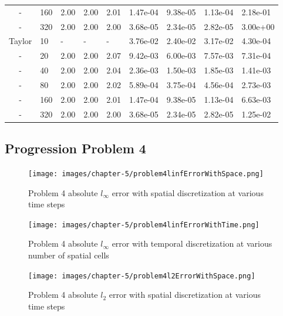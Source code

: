 \begin{table}[p]
{\begin{tabular}{cllllllll}
   - & 160 & 2.00 & 2.00 & 2.01 & 1.47e-04 & 9.38e-05 & 1.13e-04 & 2.18e-01 \\ 
   - & 320 & 2.00 & 2.00 & 2.00 & 3.68e-05 & 2.34e-05 & 2.82e-05 & 3.00e+00 \\ 
   \hline
   Taylor  &  10 & - & - & - & 3.76e-02 & 2.40e-02 & 3.17e-02 & 4.30e-04 \\ 
   -  &  20 & 2.00 & 2.00 & 2.07 & 9.42e-03 & 6.00e-03 & 7.57e-03 & 7.31e-04 \\ 
   -  &  40 & 2.00 & 2.00 & 2.04 & 2.36e-03 & 1.50e-03 & 1.85e-03 & 1.41e-03 \\ 
   -  &  80 & 2.00 & 2.00 & 2.02 & 5.89e-04 & 3.75e-04 & 4.56e-04 & 2.73e-03 \\ 
   -  & 160 & 2.00 & 2.00 & 2.01 & 1.47e-04 & 9.38e-05 & 1.13e-04 & 6.63e-03 \\ 
   -  & 320 & 2.00 & 2.00 & 2.00 & 3.68e-05 & 2.34e-05 & 2.82e-05 & 1.25e-02 \\ 
   \hline
   \end{tabular}
   }
\end{table}

\subsection{Progression Problem 4}
\begin{figure}[p]
    \centering
    \texttt{[image: images/chapter-5/problem4linfErrorWithSpace.png]}
    \caption{Problem 4 absolute $l_{\infty}$ error with spatial discretization at various time steps }
    \label{fig:problem4_linferror_spatial_results}
\end{figure}

\clearpage

\begin{figure}[p]
    \centering
    \texttt{[image: images/chapter-5/problem4linfErrorWithTime.png]}
    \caption{Problem 4 absolute $l_{\infty}$ error with temporal discretization at various number of spatial cells}
    \label{fig:problem4_linferror_time_results}
\end{figure}


\begin{figure}[p]
    \centering
    \texttt{[image: images/chapter-5/problem4l2ErrorWithSpace.png]}
    \caption{Problem 4 absolute $l_{2}$ error with spatial discretization at various time steps }
    \label{fig:problem4_l2error_spatial_results}
\end{figure}

\clearpage

